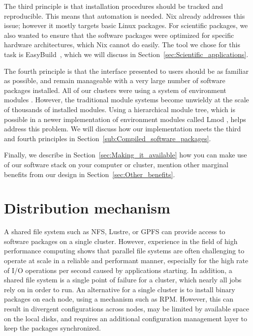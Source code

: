 \documentclass[sigconf]{acmart}
\begin{document}
The third principle is that installation procedures should be tracked and reproducible. This means that automation is needed. Nix already addresses this issue; however it mostly targets basic Linux packages. For scientific packages, we also wanted to ensure that the software packages were optimized for specific hardware architectures, which Nix cannot do easily. The tool we chose for this task is EasyBuild~\cite{EasyBuild2012,EasyBuild2014,EasyBuild2016}, which we will discuss in Section~\ref{sec:Scientific_applications}.

The fourth principle is that the interface presented to users should be as familiar as possible, and remain manageable with a very large number of software packages installed. All of our clusters were using a system of environment modules \cite{Modules1991,Modules1996}. However, the traditional module systems become unwieldy at the scale of thousands of installed modules. Using a hierarchical module tree, which is possible in a newer implementation of environment modules called Lmod \cite{Lmod}, helps address this problem. We will discuss how our implementation meets the third and fourth principles in Section~\ref{sub:Compiled_software_packages}.

Finally, we describe in Section~\ref{sec:Making_it_available} how you can make use of our software stack on your computer or cluster, mention other marginal benefits from our design in Section~\ref{sec:Other_benefits}.

\section{Distribution mechanism}
\label{sec:Distribution_mechanism}
A shared file system such as NFS, Lustre, or GPFS can provide access to software packages on a single cluster. However, experience in the field of high performance computing shows that parallel file systems are often challenging to operate at scale in a reliable and performant manner, especially for the high rate of I/O operations per second caused by applications starting. In addition, a shared file system is a single point of failure for a cluster, which nearly all jobs rely on in order to run. An alternative for a single cluster is to install binary packages on each node, using a mechanism such as RPM. However, this can result in divergent configurations across nodes, may be limited by available space on the local disks, and requires an additional configuration management layer to keep the packages synchronized. 
\end{document}
